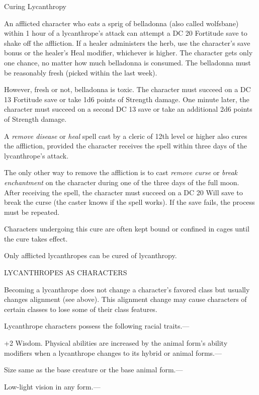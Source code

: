 \documentclass{article}
\begin{document}
\vspace{12pt}
Curing Lycanthropy

An afflicted character who eats a sprig of belladonna (also called wolfsbane) within 
1 hour of a lycanthrope's attack can attempt a DC 20 Fortitude save to shake off 
the affliction. If a healer administers the herb, use the character's save bonus 
or the healer's Heal modifier, whichever is higher. The character gets only one 
chance, no matter how much belladonna is consumed. The belladonna must be reasonably 
fresh (picked within the last week).

However, fresh or not, belladonna is toxic. The character must succeed on a DC 
13 Fortitude save or take 1d6 points of Strength damage. One minute later, the 
character must succeed on a second DC 13 save or take an additional 2d6 points 
of Strength damage. 

A \textit{remove disease }or \textit{heal }spell cast by a cleric of 12th level 
or higher also cures the affliction, provided the character receives the spell 
within three days of the lycanthrope's attack.

The only other way to remove the affliction is to cast \textit{remove curse }or 
\textit{break enchantment }on the character during one of the three days of the 
full moon. After receiving the spell, the character must succeed on a DC 20 Will 
save to break the curse (the caster knows if the spell works). If the save fails, 
the process must be repeated. 

Characters undergoing this cure are often kept bound or confined in cages until 
the cure takes effect.

Only afflicted lycanthropes can be cured of lycanthropy.

\vspace{12pt}
LYCANTHROPES AS CHARACTERS

Becoming a lycanthrope does not change a character's favored class but usually 
changes alignment (see above). This alignment change may cause characters of certain 
classes to lose some of their class features.

Lycanthrope characters possess the following racial traits.--- 

\parindent=3pt
+2 Wisdom. Physical abilities are increased by the animal form's ability modifiers 
when a lycanthrope changes to its hybrid or animal forms.---

\parindent=0pt
Size same as the base creature or the base animal form.---

Low-light vision in any form.---
\end{document}

